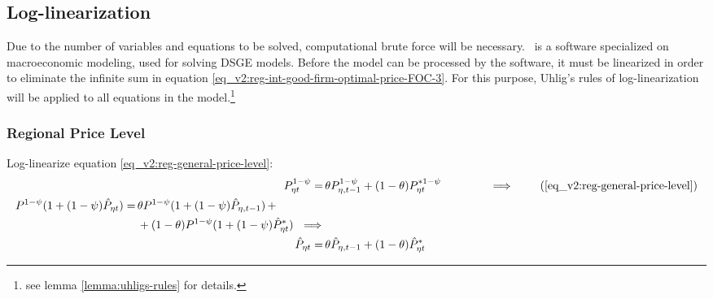 \documentclass[../thesis.tex]{subfiles}
\begin{document}
		\begin{comment}
			Y_{1} &= \left[ \left( \frac{a_{1}}{1 - b_{1}} \right) \left( \frac{1}{\omega_{11}^{\omega_{11}} (1 - \omega_{11})^{1 - \omega_{11}}} \right) \right]^{\frac{\sigma}{\sigma + \varphi}} \tag{\ref{eq_v2:reg-ss-total-y1}}
			\\
			Y_{2} &= \left[ \left( \frac{a_{2}}{1 - b_{2}} \right) \left( \frac{1}{\omega_{21}^{\omega_{21}} (1 - \omega_{21})^{1 - \omega_{21}}} \right) \right]^{\frac{\sigma}{\sigma + \varphi}} \tag{\ref{eq_v2:reg-ss-total-y2}}
			\\
		\end{comment}

	\newpage
	
	
\subsection{Log-linearization}
	
	Due to the number of variables and equations to be solved, computational brute force will be necessary. \dynare \ is a software specialized on macroeconomic modeling, used for solving DSGE models. Before the model can be processed by the software, it must be linearized in order to eliminate the infinite sum in equation \ref{eq_v2:reg-int-good-firm-optimal-price-FOC-3}. For this purpose, Uhlig's rules of log-linearization \cite{uhlig_toolkit_1999} will be applied to all equations in the model.\footnote{see lemma \ref{lemma:uhligs-rules} for details.}


\subsubsection*{Regional Price Level}

Log-linearize equation \ref{eq_v2:reg-general-price-level}:
\begin{align}
	P_{\eta t}^{1-\psi} =\, &\theta P_{\eta, t-1}^{1-\psi} + (1-\theta) P_{\eta t}^{\ast 1-\psi} \qquad \qquad \implies \tag{\ref{eq_v2:reg-general-price-level}} \\
	\begin{split} P^{1-\psi} (1 + (1-\psi)\hat{P}_{\eta t}) =\, &\theta P^{1-\psi} (1 + (1-\psi)\hat{P}_{\eta, t-1}) \, + \\ & + (1-\theta) P^{1-\psi} (1 + (1-\psi)\hat{P}_{\eta t}^{\ast}) \ \implies \nonumber \end{split} \\
	\hat{P}_{\eta t} =\, &\theta \hat{P}_{\eta, t-1} + (1-\theta) \hat{P}_{\eta t}^{\ast}
	\label{eq_v2:reg-ll-general-price-level}
\end{align}
\end{document}
